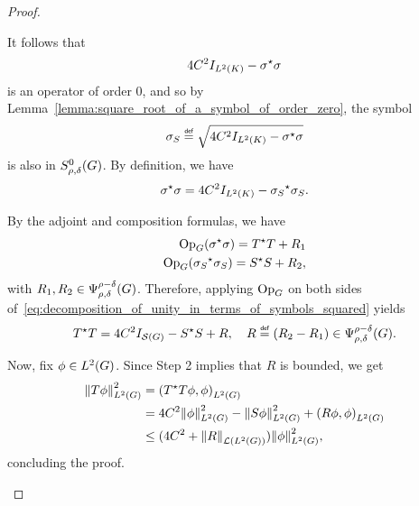\begin{proof}
\begin{description}
            It follows that
            \begin{align*}
                4 C^2 \Id {\Lebesgue 2 \CompactGroup} - \adj \sigma \sigma
            \end{align*}
            is an operator of order $0$,
            and so by Lemma~\ref{lemma:square_root_of_a_symbol_of_order_zero}, the symbol
            \begin{align*}
                \sigma_S \defeq \sqrt{4 C^2 \Id {\Lebesgue 2 \CompactGroup} - \adj \sigma \sigma}
            \end{align*}
            is also in $\SymbolClass 0 {\rho, \delta}$.
            By definition, we have
            \begin{align}
                \adj \sigma \sigma = 4 C^2 \Id {\Lebesgue 2 \CompactGroup} - \adj {\sigma_S} \sigma_S.
                \label{eq:decomposition_of_unity_in_terms_of_symbols_squared}
            \end{align}

            By the adjoint and composition formulas,
            we have
            \begin{align*}
                \Op(\adj \sigma \sigma) = \adj T T + R_1\\
                \Op(\adj {\sigma_S} \sigma_S) = \adj S S +  R_2,
            \end{align*}
            with $R_1, R_2 \in \OperatorClass {\rho - \delta} {\rho, \delta}$.
            Therefore, applying $\Op$ on both sides of~\eqref{eq:decomposition_of_unity_in_terms_of_symbols_squared} yields
            \begin{align*}
                \adj T T = 4 C^2 \Id {\Schwartz \Group} - \adj S S + R,
                \quad R \defeq (R_2 - R_1) \in \OperatorClass {\rho - \delta} {\rho, \delta}.
            \end{align*}

            Now, fix $\phi \in \Lebesgue 2 \Group$.
            Since Step 2 implies that $R$ is bounded,
            we get
            \begin{align*}
                \norm [\Lebesgue 2 \Group] {T \phi}^2
                &= \ip [\Lebesgue 2 \Group] {\adj T T \phi} \phi\\
                &= 4 C^2 \norm [\Lebesgue 2 \Group] \phi^2 - \norm [\Lebesgue 2 \Group] {S \phi}^2 + \ip [\Lebesgue 2 \Group] {R \phi} {\phi}\\
                &\leq (4 C^2 + \norm [\Lin {\Lebesgue 2 \Group}] R) \norm [\Lebesgue 2 \Group] \phi^2,
            \end{align*}
            concluding the proof.
    \end{description}
\end{proof}


